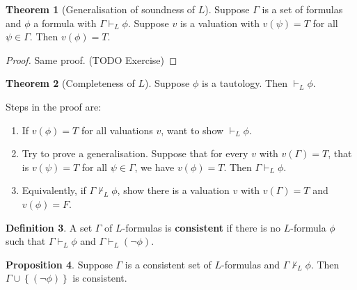 \documentclass{article}
\newcommand{\rb}[1]{\left( #1 \right)}
\newcommand{\cb}[1]{\left\{ #1 \right\}}
\newcommand{\notb}[1]{\rb{\neg #1}}
\theoremstyle{definition}\newtheorem{definition}{Definition}[subsection]
\theoremstyle{definition}\newtheorem{remark}[definition]{Remark}
\theoremstyle{definition}\newtheorem*{example}{Example}
\theoremstyle{definition}\newtheorem*{note}{Note}
\newtheorem{proposition}[definition]{Proposition}
\newtheorem{theorem}[definition]{Theorem}
\begin{document}
\begin{theorem}[Generalisation of soundness of $ L $]
Suppose $ \Gamma $ is a set of formulas and $ \phi $ a formula with $ \Gamma \vdash_L \phi $. Suppose $ v $ is a valuation with $ v\rb{\psi} = T $ for all $ \psi \in \Gamma $. Then $ v\rb{\phi} = T $.
\end{theorem}

\begin{proof}
Same proof. (TODO Exercise)
\end{proof}

\begin{theorem}[Completeness of $ L $]
\label{thm:1.3.4}
Suppose $ \phi $ is a tautology. Then $ \vdash_L \phi $.
\end{theorem}

Steps in the proof are:
\begin{enumerate}
\item If $ v\rb{\phi} = T $ for all valuations $ v $, want to show $ \vdash_L \phi $.
\item Try to prove a generalisation. Suppose that for every $ v $ with $ v\rb{\Gamma} = T $, that is $ v\rb{\psi} = T $ for all $ \psi \in \Gamma $, we have $ v\rb{\phi} = T $. Then $ \Gamma \vdash_L \phi $.
\item Equivalently, if $ \Gamma \not\vdash_L \phi $, show there is a valuation $ v $ with $ v\rb{\Gamma} = T $ and $ v\rb{\phi} = F $.
\end{enumerate}

\begin{definition}
A set $ \Gamma $ of $ L $-formulas is \textbf{consistent} if there is no $ L $-formula $ \phi $ such that $ \Gamma \vdash_L \phi $ and $ \Gamma \vdash_L \notb{\phi} $.
\end{definition}

\begin{proposition}
\label{prop:1.3.7}
Suppose $ \Gamma $ is a consistent set of $ L $-formulas and $ \Gamma \not\vdash_L \phi $. Then $ \Gamma \cup \cb{\notb{\phi}} $ is consistent.
\end{proposition}
\end{document}
